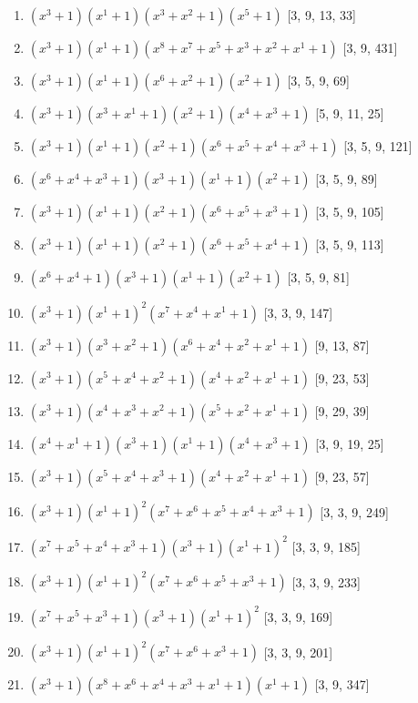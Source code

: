 \documentclass[10pt,twocolumn]{article}
\begin{document}
\begin{enumerate}
\item $(x^{3} + 1)(x^{1} + 1)(x^{3} + x^{2} + 1)(x^{5} + 1)$  [3, 9, 13, 33]
\item $(x^{3} + 1)(x^{1} + 1)(x^{8} + x^{7} + x^{5} + x^{3} + x^{2} + x^{1} + 1)$  [3, 9, 431]
\item $(x^{3} + 1)(x^{1} + 1)(x^{6} + x^{2} + 1)(x^{2} + 1)$  [3, 5, 9, 69]
\item $(x^{3} + 1)(x^{3} + x^{1} + 1)(x^{2} + 1)(x^{4} + x^{3} + 1)$  [5, 9, 11, 25]
\item $(x^{3} + 1)(x^{1} + 1)(x^{2} + 1)(x^{6} + x^{5} + x^{4} + x^{3} + 1)$  [3, 5, 9, 121]
\item $(x^{6} + x^{4} + x^{3} + 1)(x^{3} + 1)(x^{1} + 1)(x^{2} + 1)$  [3, 5, 9, 89]
\item $(x^{3} + 1)(x^{1} + 1)(x^{2} + 1)(x^{6} + x^{5} + x^{3} + 1)$  [3, 5, 9, 105]
\item $(x^{3} + 1)(x^{1} + 1)(x^{2} + 1)(x^{6} + x^{5} + x^{4} + 1)$  [3, 5, 9, 113]
\item $(x^{6} + x^{4} + 1)(x^{3} + 1)(x^{1} + 1)(x^{2} + 1)$  [3, 5, 9, 81]
\item $(x^{3} + 1)(x^{1} + 1)^{2}(x^{7} + x^{4} + x^{1} + 1)$  [3, 3, 9, 147]
\item $(x^{3} + 1)(x^{3} + x^{2} + 1)(x^{6} + x^{4} + x^{2} + x^{1} + 1)$  [9, 13, 87]
\item $(x^{3} + 1)(x^{5} + x^{4} + x^{2} + 1)(x^{4} + x^{2} + x^{1} + 1)$  [9, 23, 53]
\item $(x^{3} + 1)(x^{4} + x^{3} + x^{2} + 1)(x^{5} + x^{2} + x^{1} + 1)$  [9, 29, 39]
\item $(x^{4} + x^{1} + 1)(x^{3} + 1)(x^{1} + 1)(x^{4} + x^{3} + 1)$  [3, 9, 19, 25]
\item $(x^{3} + 1)(x^{5} + x^{4} + x^{3} + 1)(x^{4} + x^{2} + x^{1} + 1)$  [9, 23, 57]
\item $(x^{3} + 1)(x^{1} + 1)^{2}(x^{7} + x^{6} + x^{5} + x^{4} + x^{3} + 1)$  [3, 3, 9, 249]
\item $(x^{7} + x^{5} + x^{4} + x^{3} + 1)(x^{3} + 1)(x^{1} + 1)^{2}$  [3, 3, 9, 185]
\item $(x^{3} + 1)(x^{1} + 1)^{2}(x^{7} + x^{6} + x^{5} + x^{3} + 1)$  [3, 3, 9, 233]
\item $(x^{7} + x^{5} + x^{3} + 1)(x^{3} + 1)(x^{1} + 1)^{2}$  [3, 3, 9, 169]
\item $(x^{3} + 1)(x^{1} + 1)^{2}(x^{7} + x^{6} + x^{3} + 1)$  [3, 3, 9, 201]
\item $(x^{3} + 1)(x^{8} + x^{6} + x^{4} + x^{3} + x^{1} + 1)(x^{1} + 1)$  [3, 9, 347]

\end{enumerate}
\end{document}
